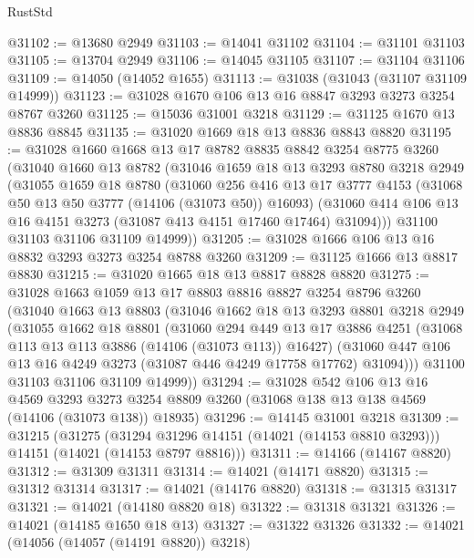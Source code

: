 \begin{lexlean}{RustStd}
\begin{coremodule}
@31102 := @13680 @2949
@31103 := @14041 @31102
@31104 := @31101 @31103
@31105 := @13704 @2949
@31106 := @14045 @31105
@31107 := @31104 @31106
@31109 := @14050 (@14052 @1655)
@31113 := @31038 (@31043 (@31107 @31109 @14999))
@31123 := @31028 @1670 @106 @13 @16 @8847 @3293 @3273 @3254 @8767 @3260
@31125 := @15036 @31001 @3218
@31129 := @31125 @1670 @13 @8836 @8845
@31135 := @31020 @1669 @18 @13 @8836 @8843 @8820
@31195 := @31028
    @1660
    @1668
    @13
    @17
    @8782
    @8835
    @8842
    @3254
    @8775
    @3260
    (@31040
      @1660
      @13
      @8782
      (@31046
        @1659
        @18
        @13
        @3293
        @8780
        @3218
        @2949
        (@31055
          @1659
          @18
          @8780
          (@31060
            @256
            @416
            @13
            @17
            @3777
            @4153
            (@31068 @50 @13 @50 @3777 (@14106 (@31073 @50)) @16093)
            (@31060 @414 @106 @13 @16 @4151 @3273 (@31087 @413 @4151 @17460 @17464) @31094)))
        @31100
        @31103
        @31106
        @31109
        @14999))
@31205 := @31028 @1666 @106 @13 @16 @8832 @3293 @3273 @3254 @8788 @3260
@31209 := @31125 @1666 @13 @8817 @8830
@31215 := @31020 @1665 @18 @13 @8817 @8828 @8820
@31275 := @31028
    @1663
    @1059
    @13
    @17
    @8803
    @8816
    @8827
    @3254
    @8796
    @3260
    (@31040
      @1663
      @13
      @8803
      (@31046
        @1662
        @18
        @13
        @3293
        @8801
        @3218
        @2949
        (@31055
          @1662
          @18
          @8801
          (@31060
            @294
            @449
            @13
            @17
            @3886
            @4251
            (@31068 @113 @13 @113 @3886 (@14106 (@31073 @113)) @16427)
            (@31060 @447 @106 @13 @16 @4249 @3273 (@31087 @446 @4249 @17758 @17762) @31094)))
        @31100
        @31103
        @31106
        @31109
        @14999))
@31294 := @31028
    @542
    @106
    @13
    @16
    @4569
    @3293
    @3273
    @3254
    @8809
    @3260
    (@31068 @138 @13 @138 @4569 (@14106 (@31073 @138)) @18935)
@31296 := @14145 @31001 @3218
@31309 := @31215
    (@31275
      (@31294 @31296 @14151 (@14021 (@14153 @8810 @3293)))
      @14151
      (@14021 (@14153 @8797 @8816)))
@31311 := @14166 (@14167 @8820)
@31312 := @31309 @31311
@31314 := @14021 (@14171 @8820)
@31315 := @31312 @31314
@31317 := @14021 (@14176 @8820)
@31318 := @31315 @31317
@31321 := @14021 (@14180 @8820 @18)
@31322 := @31318 @31321
@31326 := @14021 (@14185 @1650 @18 @13)
@31327 := @31322 @31326
@31332 := @14021 (@14056 (@14057 (@14191 @8820)) @3218)

\end{coremodule}
\end{lexlean}
